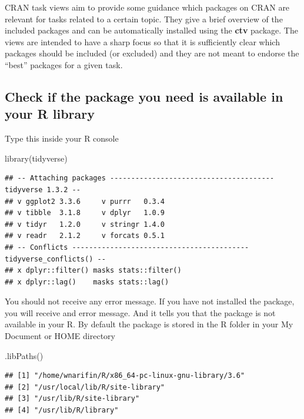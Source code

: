 \documentclass[
  10pt,
]{krantz}
\newenvironment{Shaded}{\begin{snugshade}}{\end{snugshade}}
\newcommand{\FunctionTok}[1]{\textcolor[rgb]{0.00,0.00,0.00}{#1}}
\newcommand{\NormalTok}[1]{#1}
\begin{document}
CRAN task views aim to provide some guidance which packages on CRAN are relevant for tasks related to a certain topic. They give a brief overview of the included packages and can be automatically installed using the \textbf{ctv} package. The views are intended to have a sharp focus so that it is sufficiently clear which packages should be included (or excluded) and they are not meant to endorse the ``best'' packages for a given task.

\hypertarget{check-if-the-package-you-need-is-available-in-your-r-library}{%
\subsection{Check if the package you need is available in your R library}\label{check-if-the-package-you-need-is-available-in-your-r-library}}

Type this inside your R console

\begin{Shaded}
\begin{Highlighting}[]
\FunctionTok{library}\NormalTok{(tidyverse)}
\end{Highlighting}
\end{Shaded}

\begin{verbatim}
## -- Attaching packages --------------------------------------- tidyverse 1.3.2 --
## v ggplot2 3.3.6     v purrr   0.3.4
## v tibble  3.1.8     v dplyr   1.0.9
## v tidyr   1.2.0     v stringr 1.4.0
## v readr   2.1.2     v forcats 0.5.1
## -- Conflicts ------------------------------------------ tidyverse_conflicts() --
## x dplyr::filter() masks stats::filter()
## x dplyr::lag()    masks stats::lag()
\end{verbatim}

You should not receive any error message. If you have not installed the package, you will receive and error message. And it tells you that the package is not available in your R. By default the package is stored in the R folder in your My Document or HOME directory

\begin{Shaded}
\begin{Highlighting}[]
\FunctionTok{.libPaths}\NormalTok{()}
\end{Highlighting}
\end{Shaded}

\begin{verbatim}
## [1] "/home/wnarifin/R/x86_64-pc-linux-gnu-library/3.6"
## [2] "/usr/local/lib/R/site-library"                   
## [3] "/usr/lib/R/site-library"                         
## [4] "/usr/lib/R/library"
\end{verbatim}
\end{document}
